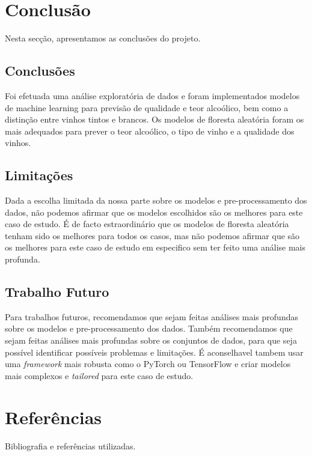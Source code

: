 \documentclass{article}
\begin{document}
\section{Conclusão}
Nesta secção, apresentamos as conclusões do projeto.

\subsection{Conclusões}
Foi efetuada uma análise exploratória de dados e foram implementados modelos de machine learning para previsão de qualidade e teor alcoólico, bem como a distinção entre vinhos tintos e brancos. Os modelos de floresta aleatória foram os mais adequados para prever o teor alcoólico, o tipo de vinho e a qualidade dos vinhos.

\subsection{Limitações}

Dada a escolha limitada da nossa parte sobre os modelos e pre-processamento dos dados, não podemos afirmar que os modelos escolhidos são os melhores para este caso de estudo. É de facto estraordinário que os modelos de floresta aleatória tenham sido os melhores para todos os casos, mas não podemos afirmar que são os melhores para este caso de estudo em especifico sem ter feito uma análise mais profunda.

\subsection{Trabalho Futuro}

Para trabalhos futuros, recomendamos que sejam feitas análises mais profundas sobre os modelos e pre-processamento dos dados. Também recomendamos que sejam feitas análises mais profundas sobre os conjuntos de dados, para que seja possível identificar possíveis problemas e limitações. É aconselhavel tambem usar uma \textit{framework} mais robusta como o PyTorch ou TensorFlow e criar modelos mais complexos e \textit{tailored} para este caso de estudo.

\section{Referências}
Bibliografia e referências utilizadas.
\end{document}
